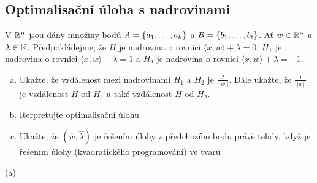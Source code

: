 \subsection{Optimalisační úloha s nadrovinami}
V $\mathbb{R}^n$ jsou dány množiny bodů $A = \left\lbrace a_1, \dots, a_k \right\rbrace$ a $B = \left\lbrace b_1, \dots, b_t \right\rbrace$. Ať $w \in \mathbb{R}^n$ a $\lambda \in \mathbb{R}$.
Předpokládejme, že $H$ je nadrovina o rovnici $\langle x,w \rangle + \lambda = 0$, $H_1$ je nadrovina o rovnici
$\langle x, w \rangle + \lambda = 1$ a $H_2$ je nadrovina o rovnici $\langle x, w \rangle + \lambda = -1$.
\begin{enumerate}[(a)]
    \item Ukažte, že vzdálenost mezi nadrovinami $H_1$ a $H_2$ je $\frac{2}{||w||}$. Dále ukažte, že $\frac{1}{||w||}$
    je vzdálenost $H$ od $H_1$ a také vzdálenost $H$ od $H_2$.
    \item Iterpretujte optimalisační úlohu
    \item Ukažte, že $(\hat w,\hat \lambda)$ je řešením úlohy z předchozího bodu právě tehdy, když je řešením úlohy
    (kvadratického programování) ve tvaru
\end{enumerate}

(a) 

